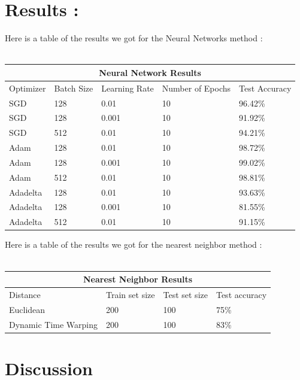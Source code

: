 \documentclass[10pt,a4paper]{article}
\begin{document}
\section{Results :}
Here is a table of the results we got for the Neural Networks method :\\\\

\begin{center}
\begin{tabular}{|p{3cm}||p{3cm}|p{3cm}|p{3cm}|p{3cm}|}
\hline
\multicolumn{5}{|c|}{Neural Network Results} \\
\hline
Optimizer & Batch Size & Learning Rate & Number of Epochs & Test Accuracy\\
\hline
SGD & 128 & 0.01 & 10 & 96.42\%\\
\hline
SGD & 128 & 0.001 & 10 & 91.92\%\\
\hline
SGD & 512 & 0.01 & 10 & 94.21\%\\
\hline
Adam & 128 & 0.01 & 10 & 98.72\%\\
\hline
Adam & 128 & 0.001 & 10 & 99.02\%\\
\hline
Adam & 512 & 0.01 & 10 & 98.81\%\\
\hline
Adadelta & 128 & 0.01 &10 & 93.63\%\\
\hline
Adadelta & 128 & 0.001 &10 & 81.55\%\\
\hline
Adadelta & 512 & 0.01 &10 & 91.15\%\\
\hline
\end{tabular}
\end{center}

Here is a table of the results we got for the nearest neighbor method :\\\\

\begin{center}
\begin{tabular}{|p{5cm}||p{3cm}|p{3cm}|p{3cm}|}
\hline
\multicolumn{4}{|c|}{Nearest Neighbor Results}\\
\hline
Distance & Train set size & Test set size & Test accuracy\\
\hline
Euclidean & 200 & 100 & 75\%\\
\hline
Dynamic Time Warping & 200 & 100 & 83\%\\
\hline
\end{tabular}
\end{center}

\section{Discussion}
\end{document}
